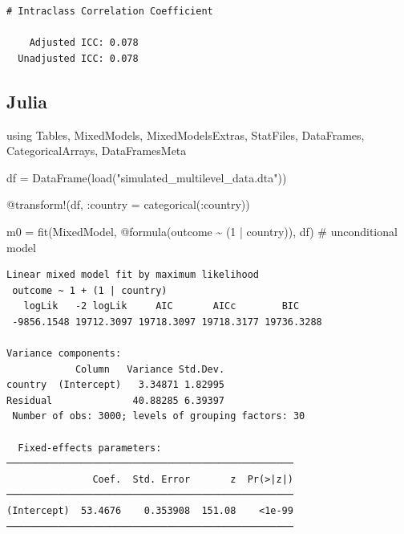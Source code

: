 \documentclass[
  letterpaper,
  DIV=11,
  numbers=noendperiod]{scrreprt}
\newenvironment{Shaded}{\begin{snugshade}}{\end{snugshade}}
\newcommand{\BuiltInTok}[1]{\textcolor[rgb]{0.00,0.23,0.31}{#1}}
\newcommand{\CommentTok}[1]{\textcolor[rgb]{0.37,0.37,0.37}{#1}}
\newcommand{\FloatTok}[1]{\textcolor[rgb]{0.68,0.00,0.00}{#1}}
\newcommand{\FunctionTok}[1]{\textcolor[rgb]{0.28,0.35,0.67}{#1}}
\newcommand{\ImportTok}[1]{\textcolor[rgb]{0.00,0.46,0.62}{#1}}
\newcommand{\NormalTok}[1]{\textcolor[rgb]{0.00,0.23,0.31}{#1}}
\newcommand{\OperatorTok}[1]{\textcolor[rgb]{0.37,0.37,0.37}{#1}}
\newcommand{\PreprocessorTok}[1]{\textcolor[rgb]{0.68,0.00,0.00}{#1}}
\newcommand{\StringTok}[1]{\textcolor[rgb]{0.13,0.47,0.30}{#1}}
\begin{document}
\begin{verbatim}
# Intraclass Correlation Coefficient

    Adjusted ICC: 0.078
  Unadjusted ICC: 0.078
\end{verbatim}

\subsection{Julia}

\begin{Shaded}
\begin{Highlighting}[]
\ImportTok{using} \BuiltInTok{Tables}\NormalTok{, }\BuiltInTok{MixedModels}\NormalTok{, }\BuiltInTok{MixedModelsExtras}\NormalTok{, }
\BuiltInTok{StatFiles}\NormalTok{, }\BuiltInTok{DataFrames}\NormalTok{, }\BuiltInTok{CategoricalArrays}\NormalTok{, }\BuiltInTok{DataFramesMeta}

\NormalTok{df }\OperatorTok{=} \FunctionTok{DataFrame}\NormalTok{(}\FunctionTok{load}\NormalTok{(}\StringTok{"simulated\_multilevel\_data.dta"}\NormalTok{))}
\end{Highlighting}
\end{Shaded}

\begin{Shaded}
\begin{Highlighting}[]
\PreprocessorTok{@transform}\NormalTok{!(df, }\OperatorTok{:}\NormalTok{country }\OperatorTok{=} \FunctionTok{categorical}\NormalTok{(}\OperatorTok{:}\NormalTok{country))}
\end{Highlighting}
\end{Shaded}

\begin{Shaded}
\begin{Highlighting}[]

\NormalTok{m0 }\OperatorTok{=} \FunctionTok{fit}\NormalTok{(MixedModel, }
         \PreprocessorTok{@formula}\NormalTok{(outcome }\OperatorTok{\textasciitilde{}}\NormalTok{ (}\FloatTok{1} \OperatorTok{|}\NormalTok{ country)), df) }\CommentTok{\# unconditional model}
\end{Highlighting}
\end{Shaded}

\begin{verbatim}
Linear mixed model fit by maximum likelihood
 outcome ~ 1 + (1 | country)
   logLik   -2 logLik     AIC       AICc        BIC    
 -9856.1548 19712.3097 19718.3097 19718.3177 19736.3288

Variance components:
            Column   Variance Std.Dev.
country  (Intercept)   3.34871 1.82995
Residual              40.88285 6.39397
 Number of obs: 3000; levels of grouping factors: 30

  Fixed-effects parameters:
──────────────────────────────────────────────────
               Coef.  Std. Error       z  Pr(>|z|)
──────────────────────────────────────────────────
(Intercept)  53.4676    0.353908  151.08    <1e-99
──────────────────────────────────────────────────
\end{verbatim}
\end{document}
